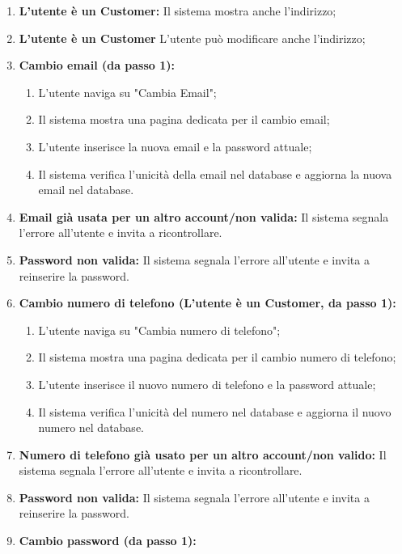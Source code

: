 \documentclass{article}
\begin{document}
	{
		\begin{enumerate}[nosep, leftmargin=25px]
			\item[\textbf{2a.}] \textbf{L'utente è un Customer:} Il sistema mostra anche l'indirizzo;
			\item[\textbf{3a.}] \textbf{L'utente è un Customer} L'utente può modificare anche l'indirizzo; 
			\item[\textbf{1a.}] \textbf{Cambio email (da passo 1):}
			\begin{enumerate}[nosep, leftmargin=*]
				\item[i.] L'utente naviga su "Cambia Email"; 
				\item[ii.] Il sistema mostra una pagina dedicata per il cambio email;
				\item[iii.] L'utente inserisce la nuova email e la password attuale; 
				\item[iv.] Il sistema verifica l'unicità della email nel database e aggiorna la nuova email nel database.
			\end{enumerate}
			\item[\textbf{1b-e.}] \textbf{Email già usata per un altro account/non valida:} Il sistema segnala l'errore all'utente e invita a ricontrollare.
			\item[\textbf{1b-e.}] \textbf{Password non valida:} Il sistema segnala l'errore all'utente e invita a reinserire la password.
			\item[\textbf{1c.}] \textbf{Cambio numero di telefono (L'utente è un Customer, da passo 1):} 
			\begin{enumerate}[nosep, leftmargin=*]
				\item[i.] L'utente naviga su "Cambia numero di telefono";
				\item[ii.] Il sistema mostra una pagina dedicata per il cambio numero di telefono;
				\item[iii.] L'utente inserisce il nuovo numero di telefono e la password attuale;
				\item[iv.] Il sistema verifica l'unicità del numero nel database e aggiorna il nuovo numero nel database.
			\end{enumerate}
			\item[\textbf{1c-e.}] \textbf{Numero di telefono già usato per un altro account/non valido:} Il sistema segnala l'errore all'utente e invita a ricontrollare.
			\item[\textbf{1c-e.}] \textbf{Password non valida:} Il sistema segnala l'errore all'utente e invita a reinserire la password.
			\item[\textbf{1d.}] \textbf{Cambio password (da passo 1):}

\end{enumerate}}
\end{document}
